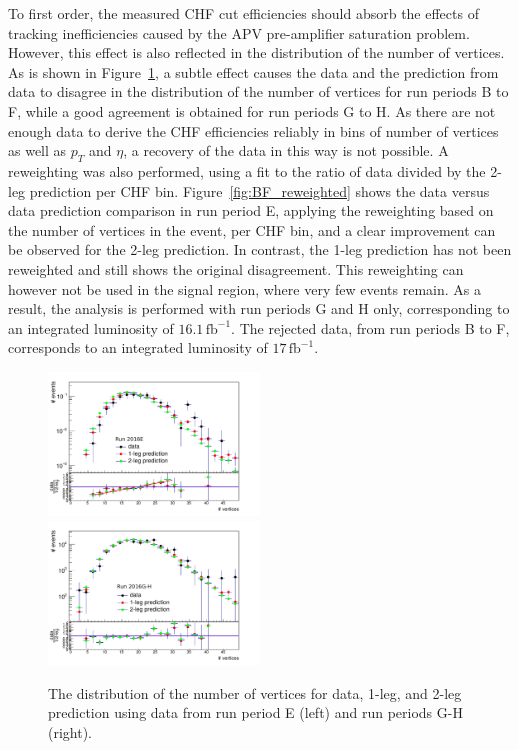 To first order, the measured CHF cut efficiencies should absorb the effects of tracking inefficiencies caused by the APV pre-amplifier saturation problem. However, this effect is also reflected in the distribution of the number of vertices. As is shown in Figure~\ref{fig:nvtx_reweighting}, a subtle effect causes the data and the prediction from data to disagree in the distribution of the number of vertices for run periods B to F, while a good agreement is obtained for run periods G to H. As there are not enough data to derive the CHF efficiencies reliably in bins of number of vertices as well as $p_T$ and $\eta$, a recovery of the data in this way is not possible. A reweighting was also performed, using a fit to the ratio of data divided by the 2-leg prediction per CHF bin. Figure~\ref{fig:BF_reweighted} shows the data versus data prediction comparison in run period E, applying the reweighting based on the number of vertices in the event, per CHF bin, and a clear improvement can be observed for the 2-leg prediction. In contrast, the 1-leg prediction has not been reweighted and still shows the original disagreement. This reweighting can however not be used in the signal region, where very few events remain. As a result, the analysis is performed with run periods G and H only, corresponding to an integrated luminosity of $16.1\,\mathrm{fb^{-1}}$. The rejected data, from run periods B to F, corresponds to an integrated luminosity of $17\, \mathrm{fb}^{-1}$.

\begin{figure}[ht]
  \centering
  \includegraphics[width=0.5\textwidth]{figures/Data_distributions_excl_RunE_ChF0p25To0p3_nvtx.pdf}\hfill%
  \includegraphics[width=0.5\textwidth]{figures/RunGH_ChF0p25To0p3_nvtx.pdf}
  \caption{The distribution of the number of vertices for data, 1-leg, and 2-leg prediction using data from run period E (left) and run periods G-H (right).}
  \label{fig:nvtx_reweighting}
\end{figure}

